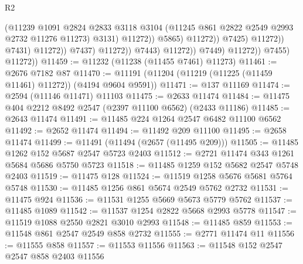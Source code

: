 \begin{lexlean}{R2}
\begin{coremodule}
                                                  (@11239
                                                    @1091
                                                    @2824
                                                    @2833
                                                    @3118
                                                    @3104
                                                    (@11245
                                                      @861
                                                      @2822
                                                      @2549
                                                      @2993
                                                      @2732
                                                      @11276
                                                      @11273)
                                                    @3131)
                                                  @11272))
                                              @5865)
                                            @11272))
                                        @7425)
                                      @11272))
                                  @7431)
                                @11272))
                            @7437)
                          @11272))
                      @7443)
                    @11272))
                @7449)
              @11272))
          @7455)
        @11272))
@11459 := @11232 (@11238 (@11455 @7461) @11273)
@11461 := @2676 @7182 @87
@11470 := @11191 (@11204 (@11219 (@11225 (@11459 @11461) @11272)) (@4194 @9604 @9591))
@11471 := @137 @11169
@11474 := @2594 (@11146 @11471) @11103
@11475 := @2633 @11474
@11484 := @11475 @404 @2212 @8492 @2547 (@2397 @11100 @6562) (@2433 @11186)
@11485 := @2643 @11474
@11491 := @11485 @224 @1264 @2547 @6482 @11100 @6562
@11492 := @2652 @11474
@11494 := @11492 @209 @11100
@11495 := @2658 @11474
@11499 := @11491 (@11494 (@2657 (@11495 @209)))
@11505 := @11485 @1262 @152 @5687 @2547 @5723 @2403
@11512 := @2721 @11474 @343 @1261 @5684 @5686 @5750 @5723
@11518 := @11485 @1259 @152 @5682 @2547 @5748 @2403
@11519 := @11475 @128
@11524 := @11519 @1258 @5676 @5681 @5764 @5748
@11530 := @11485 @1256 @861 @5674 @2549 @5762 @2732
@11531 := @11475 @924
@11536 := @11531 @1255 @5669 @5673 @5779 @5762
@11537 := @11485 @1089
@11542 := @11537 @1254 @2822 @5668 @2993 @5778
@11547 := @11519 @1088 @2550 @2821 @3010 @2993
@11548 := @11485 @859
@11553 := @11548 @861 @2547 @2549 @858 @2732
@11555 := @2771 @11474 @11
@11556 := @11555 @858
@11557 := @11553 @11556
@11563 := @11548 @152 @2547 @2547 @858 @2403 @11556

\end{coremodule}
\end{lexlean}
